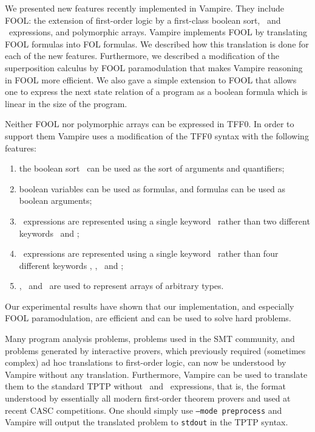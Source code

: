 We presented new features recently implemented in Vampire. They include FOOL: the extension of first-order logic by a first-class boolean sort, \ITE\ and \LETIN\ expressions, and polymorphic arrays. Vampire implements FOOL by translating FOOL formulas into FOL formulas. We described how this translation is done for each of the new features. Furthermore, we described a modification of the superposition calculus by FOOL paramodulation that makes Vampire reasoning in FOOL more efficient. 
We also gave a simple extension to FOOL that allows one to express the next state relation of a program as a boolean formula which is linear in the size of the program.

Neither FOOL nor polymorphic arrays can be expressed in TFF0. In order to support them Vampire uses a modification of the TFF0 syntax with the following features:

\begin{enumerate}
  \item the boolean sort \tptpo\ can be used as the sort of arguments and quantifiers;
  \item boolean variables can be used as formulas, and formulas can be used as boolean arguments;
  \item \ITE\ expressions are represented using a single keyword \dite\ rather than two different keywords \ditet\ and \ditef;
  \item \LETIN\ expressions are represented using a single keyword \dlet\ rather than four different keywords \dlettt, \mbox{\dlettf,} \dletft\ and \dletff;
  \item \darraySymb, \dselect\ and \dstore\ are used to represent arrays of arbitrary types.
\end{enumerate}

Our experimental results have shown that our implementation, and especially FOOL paramodulation, are efficient and can be used to solve hard problems.

Many program analysis problems, problems used in the SMT community, and problems generated by interactive provers, which previously required (sometimes complex) ad hoc translations to first-order logic, can now be understood by Vampire without any translation. Furthermore, Vampire can be used to translate them to the standard TPTP without \ITE\ and \LETIN\ expressions, that is, the format understood by essentially all modern first-order theorem provers and used at recent CASC competitions. One should simply use \texttt{--mode preprocess} and Vampire will output the translated problem to \texttt{stdout} in the TPTP syntax. 

